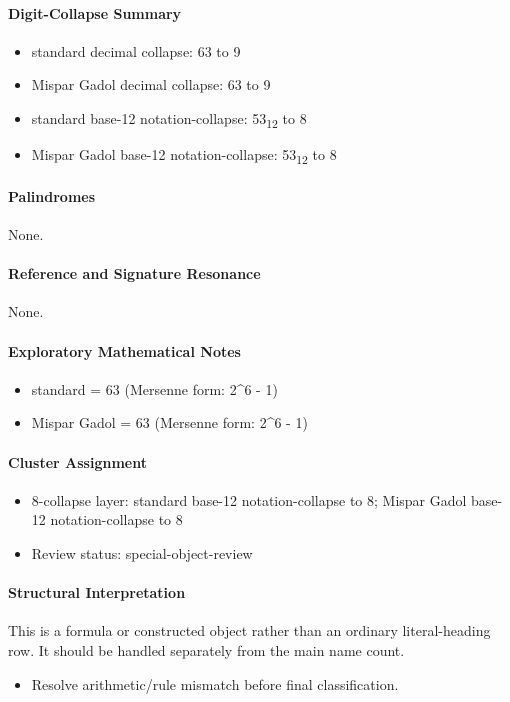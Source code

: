\paragraph{Digit-Collapse Summary}
\begin{itemize}
\item standard decimal collapse: 63 to 9
\item Mispar Gadol decimal collapse: 63 to 9
\item standard base-12 notation-collapse: 53\textsubscript{12} to 8
\item Mispar Gadol base-12 notation-collapse: 53\textsubscript{12} to 8
\end{itemize}
\paragraph{Palindromes}
None.
\paragraph{Reference and Signature Resonance}
None.
\paragraph{Exploratory Mathematical Notes}
\begin{itemize}
\item standard = 63 (Mersenne form: 2\textasciicircum{}6 - 1)
\item Mispar Gadol = 63 (Mersenne form: 2\textasciicircum{}6 - 1)
\end{itemize}
\paragraph{Cluster Assignment}
\begin{itemize}
\item 8-collapse layer: standard base-12 notation-collapse to 8; Mispar Gadol base-12 notation-collapse to 8
\item Review status: special-object-review
\end{itemize}
\paragraph{Structural Interpretation}
This is a formula or constructed object rather than an ordinary literal-heading row. It should be handled separately from the main name count.

\begin{itemize}
\item Resolve arithmetic/rule mismatch before final classification.
\end{itemize}

